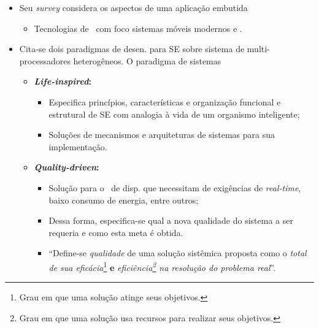    \begin{frame}{\cite{Jozwiak2017}} \vspace{-1em}
      \begin{itemize}
         \setlength{\itemsep}{0.7em}
         \item Seu \textit{survey} considera os aspectos de uma aplicação embutida
         \begin{itemize}
            \item Tecnologias de \design\ com foco sistemas móveis modernos e \wearables.
         \end{itemize}
      
         \item Cita-se dois paradigmas de desen. para SE sobre sistema de multi-processadores heterogêneos. O paradigma de sistemas 
         \begin{itemize} \setlength{\itemsep}{0.5em}
            \item \textbf{\textit{Life-inspired}:} 
            \begin{itemize}
               \item Especifica princípios, características e organização funcional e estrutural de SE com analogia à vida de um organismo inteligente;
               \item Soluções de mecanismos e arquiteturas de sistemas para sua implementação. 
            \end{itemize}
            
            \item \textbf{\textit{Quality-driven}:} 
            \begin{itemize}
               \item Solução para o \design\ de disp. que necessitam de exigências de \textit{real-time}, baixo consumo de energia, entre outros; 
               \item Dessa forma, especifica-se qual a nova qualidade do sistema a ser requeria e como esta meta é obtida. 
               \item ``Define-se \textit{qualidade} de uma solução sistêmica proposta como o \textit{total de sua eficácia}\footnote{Grau em que uma solução atinge seus objetivos.} \textbf{e} \textit{eficiência\footnote{Grau em que uma solução usa recursos para realizar seus objetivos.} na resolução do problema real}''.
            \end{itemize}
         \end{itemize}
      
      \end{itemize}
      
   \end{frame}

